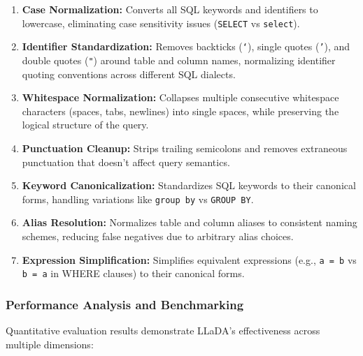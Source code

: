 \documentclass[a4paper,12pt]{article}
\begin{document}
\begin{enumerate}
    \item \textbf{Case Normalization:} Converts all SQL keywords and identifiers to lowercase, eliminating case sensitivity issues (\texttt{SELECT} vs \texttt{select}).
    
    \item \textbf{Identifier Standardization:} Removes backticks (\texttt{`}), single quotes (\texttt{'}), and double quotes (\texttt{"}) around table and column names, normalizing identifier quoting conventions across different SQL dialects.
    
    \item \textbf{Whitespace Normalization:} Collapses multiple consecutive whitespace characters (spaces, tabs, newlines) into single spaces, while preserving the logical structure of the query.
    
    \item \textbf{Punctuation Cleanup:} Strips trailing semicolons and removes extraneous punctuation that doesn't affect query semantics.
    
    \item \textbf{Keyword Canonicalization:} Standardizes SQL keywords to their canonical forms, handling variations like \texttt{group by} vs \texttt{GROUP BY}.
    
    \item \textbf{Alias Resolution:} Normalizes table and column aliases to consistent naming schemes, reducing false negatives due to arbitrary alias choices.
    
    \item \textbf{Expression Simplification:} Simplifies equivalent expressions (e.g., \texttt{a = b} vs \texttt{b = a} in WHERE clauses) to their canonical forms.
\end{enumerate}

\subsubsection*{Performance Analysis and Benchmarking}
Quantitative evaluation results demonstrate LLaDA's effectiveness across multiple dimensions:
\end{document}
